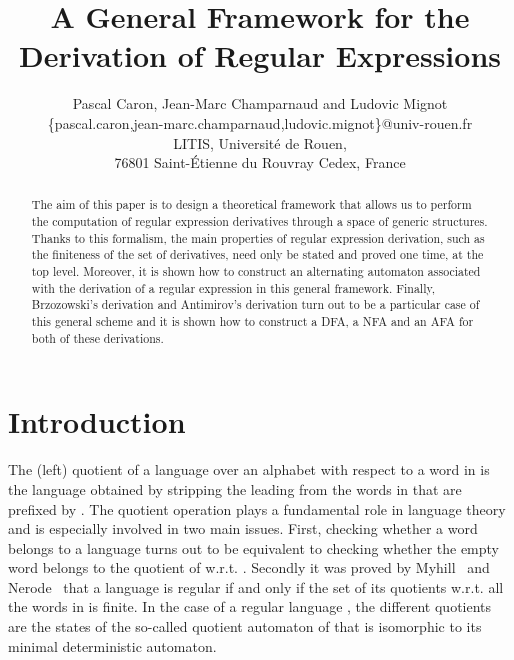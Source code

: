 \documentclass{article}
\begin{document}
\title{A General Framework for the Derivation of Regular Expressions}

  \author{
    Pascal Caron, Jean-Marc Champarnaud and Ludovic Mignot\\
    \{pascal.caron,jean-marc.champarnaud,ludovic.mignot\}@univ-rouen.fr\\
    LITIS, Universit\'e de Rouen,\\
     76801 Saint-\'Etienne du Rouvray Cedex, France
  }

  \maketitle

  
   \begin{abstract}
The aim of this paper is to design a theoretical 
framework
that allows us to perform the computation of regular expression derivatives through a space of generic structures.
Thanks to this formalism, the main properties of regular expression derivation, such as 
the finiteness of the set of derivatives,
need only be stated and proved one time, at the top level. 
Moreover, it is shown how to
construct an alternating automaton
associated with the derivation of a regular expression in this general 
framework.
Finally, Brzozowski's derivation and Antimirov's derivation turn out to be a particular case of this general scheme
and it is shown how to construct a DFA, a NFA and an AFA for both of these derivations.
  \end{abstract}
 

\section{Introduction}


The (left) quotient of a language  over an alphabet  with respect to a word  in 
is the language obtained by stripping the leading  from the words in  that are prefixed by . 
The quotient operation plays a fundamental role in language theory and is especially involved in two main issues.
First, checking whether a word  belongs to a language 
turns out to be equivalent to checking whether the empty word belongs to the quotient of  w.r.t. . 
Secondly it was proved by Myhill~\cite{Myh57} and Nerode~\cite{Ner58} that a language is regular
if and only if the set of its quotients w.r.t. all the words in  is finite.
In the case of a regular language , 
the different quotients are the states of the so-called quotient automaton of 
that is isomorphic to its minimal deterministic automaton.
\end{document}
